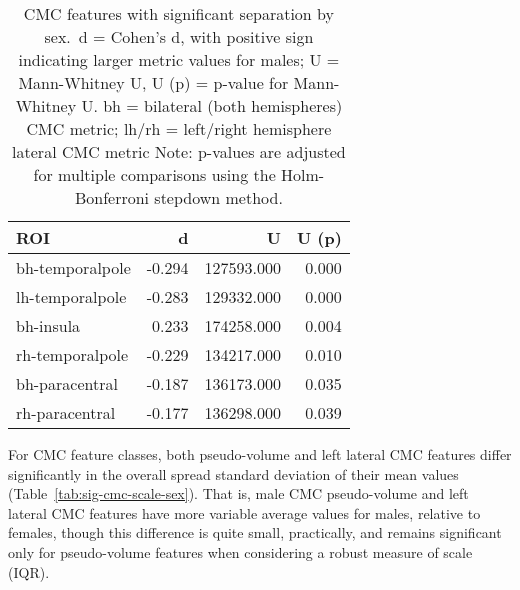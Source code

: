 \documentclass{article}
\begin{document}
\begin{table}
\centering
\begin{tabular}{lrrr}
	\toprule
	ROI & d & U & U (p) \\
	\midrule
	bh-temporalpole & -0.294 & 127593.000 & 0.000 \\
	lh-temporalpole & -0.283 & 129332.000 & 0.000 \\
	bh-insula       &  0.233 & 174258.000 & 0.004 \\
	rh-temporalpole & -0.229 & 134217.000 & 0.010 \\
	bh-paracentral  & -0.187 & 136173.000 & 0.035 \\
	rh-paracentral  & -0.177 & 136298.000 & 0.039 \\
	\bottomrule
\end{tabular}
\label{tab:sig-cmc-sex}
\footnotesize
\caption{CMC features with significant separation by sex.\
d = Cohen's d, with positive sign indicating larger metric values for males;
U = Mann-Whitney U, U (p) = p-value for Mann-Whitney U.
bh = bilateral (both hemispheres) CMC metric;
lh/rh = left/right hemisphere lateral CMC metric
Note: p-values are adjusted for multiple comparisons using the
Holm-Bonferroni stepdown method.}
\normalsize
\end{table}

For CMC feature classes, both pseudo-volume and left lateral CMC features
differ significantly in the overall spread standard deviation of their mean
values (Table~\ref{tab:sig-cmc-scale-sex}). That is, male CMC pseudo-volume
and left lateral CMC features have more variable average values for males,
relative to females, though this difference is quite small, practically, and
remains significant only for pseudo-volume features when considering a robust
measure of scale (IQR).
\end{document}
